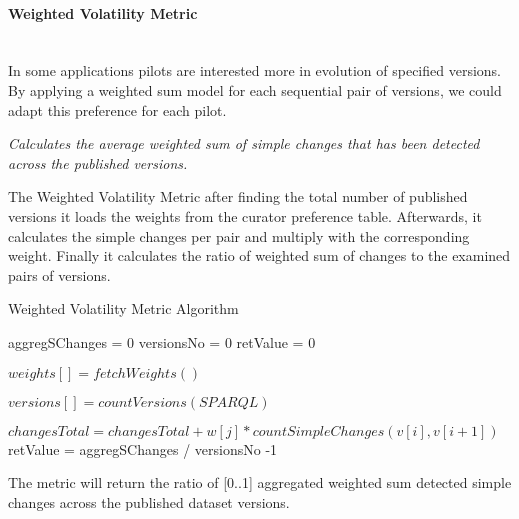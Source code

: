 
\paragraph{Weighted Volatility Metric} ~\\ %
In some applications pilots are interested more in evolution of specified versions. By applying a weighted sum model \cite{WSM} for each sequential pair of versions, we could adapt this preference for each pilot.

\begin{mdframed}[style=metricdefinition]
\emph{Calculates the average weighted sum of simple changes that has been detected across the published versions.}
\end{mdframed}

The Weighted Volatility Metric after finding the total number of published versions it loads the weights
from the curator preference table. Afterwards, it calculates the simple changes per pair and multiply with the corresponding weight. Finally it calculates the ratio of weighted sum of changes to the examined pairs of versions.


\begin{algorithm}
\caption{Weighted Volatility Metric Algorithm}
\begin{algorithmic}[1]

\State aggregSChanges = 0
\State versionsNo = 0
\State retValue = 0
\EndProcedure

\State $ weights [] = fetchWeights()$
\EndProcedure

\State $ versions [] = countVersions (SPARQL)$

\State $changesTotal = changesTotal + w[j]*countSimpleChanges(v[i],v[i+1])$
	\EndFor
\EndFor
\EndProcedure
\State retValue = aggregSChanges / versionsNo -1
\State {}
\end{algorithmic}
\end{algorithm}

The metric will return the ratio of [0..1] aggregated weighted sum detected simple changes across the published dataset versions.


